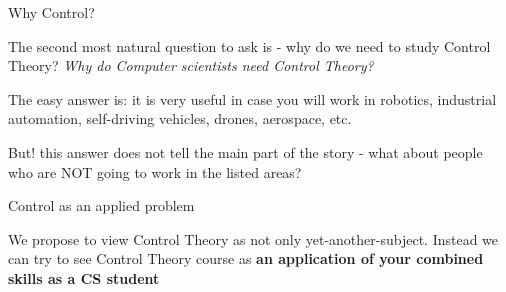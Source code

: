 \documentclass{beamer}
\begin{document}
\begin{frame}{Why Control?}
\begin{flushleft}

The second most natural question to ask is - why do we need to study Control Theory? \emph{Why do Computer scientists need Control Theory?} 

\bigskip

\begin{exampleblock}{The easy answer is:}
it is very useful in case you will work in robotics, industrial automation, self-driving vehicles, drones, aerospace, etc.
\end{exampleblock}

\bigskip

\begin{alertblock}{But!}
this answer does not tell the main part of the story - what about people who are NOT going to work in the listed areas?
\end{alertblock}

\end{flushleft}
\end{frame}


\begin{frame}{Control as an applied problem}
\begin{flushleft}

We propose to view Control Theory as not only yet-another-subject. Instead we can try to see Control Theory course as \textbf{an application of your combined skills as a CS student}

\end{flushleft}
\end{frame}
\end{document}
